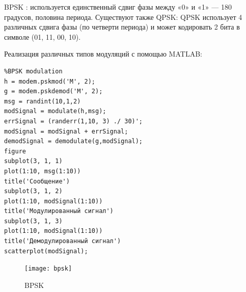 \documentclass[10pt,a4paper]{article}
\begin{document}
BPSK : используется единственный сдвиг фазы между «0» и «1» — 180 градусов, половина периода.
Существуют также QPSK:
QPSK использует 4 различных сдвига фазы (по четверти периода) и может кодировать 2 бита в символе (01, 11, 00, 10). 

Реализация различных типов модуляций с помощью MATLAB:
\begin{verbatim}
%BPSK modulation
h = modem.pskmod('M', 2);
g = modem.pskdemod('M', 2);
msg = randint(10,1,2)
modSignal = modulate(h,msg);
errSignal = (randerr(1,10, 3) ./ 30)';
modSignal = modSignal + errSignal;
demodSignal = demodulate(g,modSignal);
figure
subplot(3, 1, 1)
plot(1:10, msg(1:10))
title('Сообщение')
subplot(3, 1, 2)
plot(1:10, modSignal(1:10))
title('Модулированный сигнал')
subplot(3, 1, 3)
plot(1:10, modSignal(1:10))
title('Демодулированный сигнал')
scatterplot(modSignal);
\end{verbatim}
\begin{figure}[h]\centering
	\texttt{[image: bpsk]}
	\caption{BPSK}\label{fig.bpsk}
\end{figure}                                                                                                                                                                                                                                                                                                                                                                                                                                                                                                                                                                                                                                                                                                                                                                                                                                                                                                                                                                                                                                                                                                                                                                                                                                                                                                                                                                                                                                                                        
\end{document}
